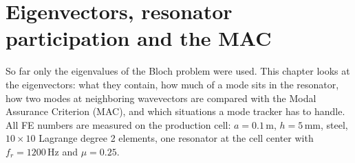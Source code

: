 
\chapter{Eigenvectors, resonator participation and the MAC}
\label{ch:eigenvectors}

So far only the eigenvalues of the Bloch problem were used. This chapter looks at
the eigenvectors: what they contain, how much of a mode sits in the resonator, how
two modes at neighboring wavevectors are compared with the Modal Assurance
Criterion (MAC), and which situations a mode tracker has to handle. All FE numbers
are measured on the production cell: $a = 0.1\,\mathrm{m}$, $h = 5\,\mathrm{mm}$,
steel, $10\times 10$ Lagrange degree 2 elements, one resonator at the cell center
with $f_r = 1200\,\mathrm{Hz}$ and $\mu = 0.25$.

